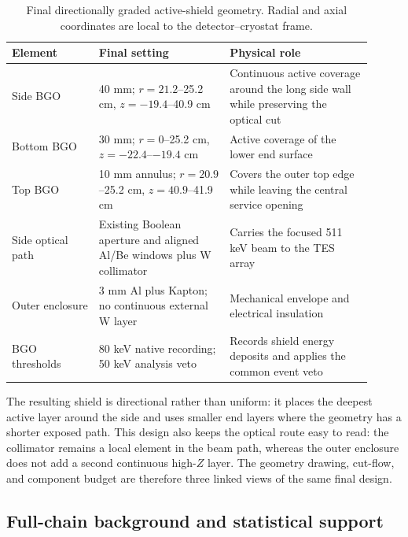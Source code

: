 \documentclass[11pt]{article}
\begin{document}
\begin{table}[!ht]
\centering
\caption{Final directionally graded active-shield geometry. Radial and axial coordinates are local to the detector--cryostat frame.}
\label{tab:final_geometry}
\footnotesize
\begin{tabular}{p{0.22\linewidth}p{0.33\linewidth}p{0.36\linewidth}}
\toprule
Element & Final setting & Physical role \\
\midrule
Side BGO & 40 mm; $r=21.2$--25.2 cm, $z=-19.4$--40.9 cm & Continuous active coverage around the long side wall while preserving the optical cut \\
Bottom BGO & 30 mm; $r=0$--25.2 cm, $z=-22.4$--$-19.4$ cm & Active coverage of the lower end surface \\
Top BGO & 10 mm annulus; $r=20.9$--25.2 cm, $z=40.9$--41.9 cm & Covers the outer top edge while leaving the central service opening \\
Side optical path & Existing Boolean aperture and aligned Al/Be windows plus W collimator & Carries the focused 511 keV beam to the TES array \\
Outer enclosure & 3 mm Al plus Kapton; no continuous external W layer & Mechanical envelope and electrical insulation \\
BGO thresholds & 80 keV native recording; 50 keV analysis veto & Records shield energy deposits and applies the common event veto \\
\bottomrule
\end{tabular}
\end{table}

The resulting shield is directional rather than uniform: it places the deepest
active layer around the side and uses smaller end layers where the geometry has a
shorter exposed path. This design also keeps the optical route easy to read: the
collimator remains a local element in the beam path, whereas the outer enclosure
does not add a second continuous high-$Z$ layer. The geometry drawing, cut-flow,
and component budget are therefore three linked views of the same final design.

\FloatBarrier

\subsection{Full-chain background and statistical support}
\label{subsec:optimized_fullchain}
\end{document}
